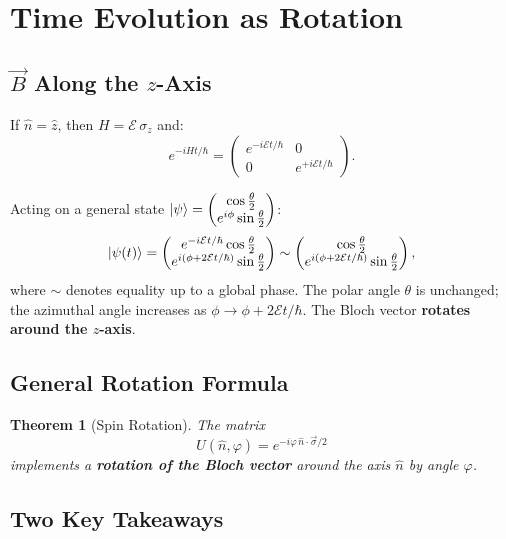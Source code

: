 \documentclass[11pt,a4paper]{article}
\theoremstyle{definition}
\theoremstyle{plain}
\newtheorem{theorem}{Theorem}[section]
\theoremstyle{remark}
\begin{document}
\section{Time Evolution as Rotation}

\subsection{$\vec{B}$ Along the $z$-Axis}

If $\hat{n} = \hat{z}$, then $H = \mathcal{E}\,\sigma_z$ and:
\[
    e^{-iHt/\hbar} = \begin{pmatrix}e^{-i\mathcal{E}t/\hbar} & 0 \\ 0 & e^{+i\mathcal{E}t/\hbar}\end{pmatrix}.
\]

Acting on a general state $\ket{\psi} = \begin{pmatrix}\cos\frac{\theta}{2} \\ e^{i\phi}\sin\frac{\theta}{2}\end{pmatrix}$:
\[
    \ket{\psi(t)} = \begin{pmatrix}e^{-i\mathcal{E}t/\hbar}\cos\frac{\theta}{2} \\ e^{i(\phi + 2\mathcal{E}t/\hbar)}\sin\frac{\theta}{2}\end{pmatrix} \sim \begin{pmatrix}\cos\frac{\theta}{2} \\ e^{i(\phi + 2\mathcal{E}t/\hbar)}\sin\frac{\theta}{2}\end{pmatrix},
\]
where $\sim$ denotes equality up to a global phase. The polar angle $\theta$ is unchanged; the azimuthal angle increases as $\phi \to \phi + 2\mathcal{E}t/\hbar$. The Bloch vector \textbf{rotates around the $z$-axis}.

\subsection{General Rotation Formula}

\begin{theorem}[Spin Rotation]
    The matrix
    \[
        U(\hat{n}, \varphi) = e^{-i\varphi\,\hat{n}\cdot\vec{\sigma}/2}
    \]
    implements a \textbf{rotation of the Bloch vector} around the axis $\hat{n}$ by angle $\varphi$.
\end{theorem}

\subsection{Two Key Takeaways}
\end{document}
